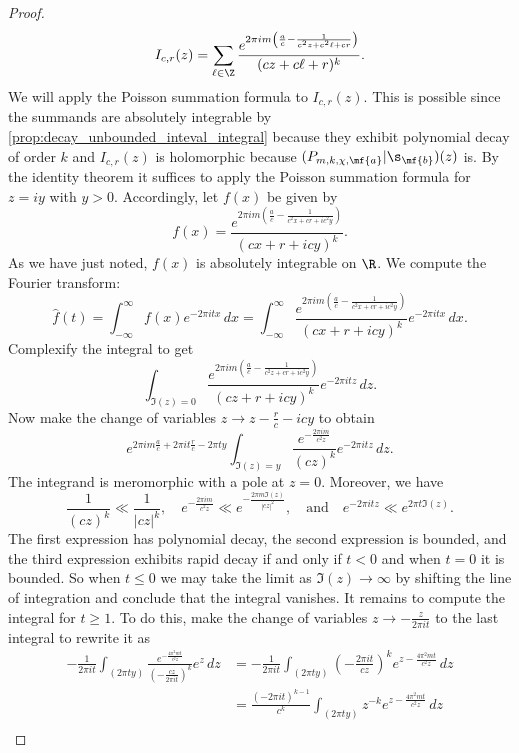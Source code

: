 \begin{proof}
      \[
        I_{c,r}(z) = \sum_{\ell \in \Z}\frac{e^{2\pi im\left(\frac{a}{c}-\frac{1}{c^{2}z+c^{2}\ell+cr}\right)}}{(cz+c\ell+r)^{k}}.
      \]
      We will apply the Poisson summation formula to $I_{c,r}(z)$. This is possible since the summands are absolutely integrable by \cref{prop:decay_unbounded_inteval_integral} because they exhibit polynomial decay of order $k$ and $I_{c,r}(z)$ is holomorphic because $(P_{m,k,\chi,\mf{a}}|\s_{\mf{b}})(z)$ is. By the identity theorem it suffices to apply the Poisson summation formula for $z = iy$ with $y > 0$. Accordingly, let $f(x)$ be given by
      \[
        f(x) = \frac{e^{2\pi im\left(\frac{a}{c}-\frac{1}{c^{2}x+cr+ic^{2}y}\right)}}{(cx+r+icy)^{k}}.
      \]
      As we have just noted, $f(x)$ is absolutely integrable on $\R$. We compute the Fourier transform:
      \[
        \hat{f}(t) = \int_{-\infty}^{\infty}f(x)e^{-2\pi itx}\,dx = \int_{-\infty}^{\infty}\frac{e^{2\pi im\left(\frac{a}{c}-\frac{1}{c^{2}x+cr+ic^{2}y}\right)}}{(cx+r+icy)^{k}}e^{-2\pi itx}\,dx.
      \]
      Complexify the integral to get
      \[
        \int_{\Im(z) = 0}\frac{e^{2\pi im\left(\frac{a}{c}-\frac{1}{c^{2}z+cr+ic^{2}y}\right)}}{(cz+r+icy)^{k}}e^{-2\pi itz}\,dz.
      \]
      Now make the change of variables $z \to z-\frac{r}{c}-icy$ to obtain
      \[
        e^{2\pi im\frac{a}{c}+2\pi it\frac{r}{c}-2\pi ty}\int_{\Im(z) = y}\frac{e^{-\frac{2\pi im}{c^{2}z}}}{(cz)^{k}}e^{-2\pi itz}\,dz.
      \]
      The integrand is meromorphic with a pole at $z = 0$. Moreover, we have
      \[
        \frac{1}{(cz)^{k}} \ll \frac{1}{|cz|^{k}}, \quad e^{-\frac{2\pi im}{c^{2}z}} \ll e^{-\frac{2\pi m\Im(z)}{|cz|^{2}}}, \quad \text{and} \quad e^{-2\pi itz} \ll e^{2\pi t\Im(z)}.
      \]
      The first expression has polynomial decay, the second expression is bounded, and the third expression exhibits rapid decay if and only if $t < 0$ and when $t = 0$ it is bounded. So when $t \le 0$ we may take the limit as $\Im(z) \to \infty$  by shifting the line of integration and conclude that the integral vanishes. It remains to compute the integral for $t \ge 1$. To do this, make the change of variables $z \to -\frac{z}{2\pi it}$ to the last integral to rewrite it as
      \begin{align*}
        -\frac{1}{2\pi it}\int_{(2\pi ty)}\frac{e^{-\frac{4\pi^{2}mt}{c^{2}z}}}{\left(-\frac{cz}{2\pi it}\right)^{k}}e^{z}\,dz &= -\frac{1}{2\pi it}\int_{(2\pi ty)}\left(-\frac{2\pi it}{cz}\right)^{k}e^{z-\frac{4\pi^{2}mt}{c^{2}z}}\,dz \\
        &= \frac{(-2\pi it)^{k-1}}{c^{k}}\int_{(2\pi ty)}z^{-k}e^{z-\frac{4\pi^{2}mt}{c^{2}z}}\,dz \\

\end{align*}
\end{proof}
